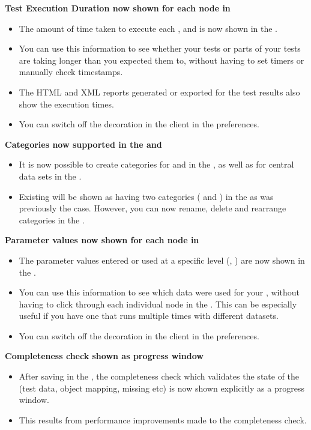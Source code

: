 \textbf{Test Execution Duration now shown for each node in \gdtestresultview{}}\\
\begin{itemize}
\item The amount of time taken to execute each \gdstep{}, \gdcase{} and \gdsuite{} is now shown in the \gdtestresultview{}.
\item You can use this information to see whether your tests or parts of your tests are taking longer than you expected them to, 
without having to set timers or manually check timestamps.
\item The HTML and XML reports generated or exported for the test results also show the execution times.
\item You can switch off the decoration in the \app{} client in the  preferences.
\end{itemize} 

\textbf{Categories now supported in the \gdtestsuitebrowser{} and \gddataeditor}\\
\begin{itemize}
\item It is now possible to create categories for \gdsuites{} and \gdjobs{} in the \gdtestsuitebrowser{}, as well as for central data sets in the \gddataeditor{}. 
\item Existing \gdprojects{} will be shown as having two categories ( and ) in the \gdtestsuitebrowser{} as was previously the case. However, you can now rename, delete and rearrange categories in the \gdtestsuitebrowser{}. 
\end{itemize} 

\textbf{Parameter values now shown for each node in \gdtestresultview{}}\\
\begin{itemize}
\item The parameter values entered or used at a specific level (\gdcase{}, \gdstep{}) are now shown in the \gdtestresultview{}.
\item You can use this information to see which data were used for your \gdcases{}, without having to click through each individual node in the \gdtestresultview{}. This can be especially useful if you have one \gdcase{} that runs multiple times with different datasets.
\item You can switch off the decoration in the \app{} client in the  preferences.
\end{itemize} 

\textbf{Completeness check shown as progress window}\\
\begin{itemize}
\item After saving in the \ite{}, the completeness check which validates the state of the \gdproject{} (test data, object mapping, missing \gdcases{} etc) is now shown explicitly as a progress window.
\item This results from performance improvements made to the completeness check.
\end{itemize} 
